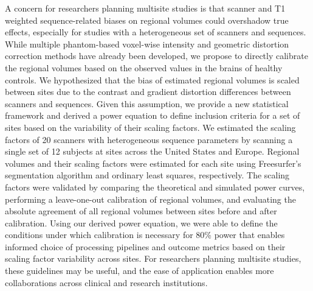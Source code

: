 
A concern for researchers planning multisite studies is that scanner and T1 weighted sequence-related biases on regional volumes could overshadow true effects, especially for studies with a heterogeneous set of scanners and sequences. While multiple phantom-based voxel-wise intensity and geometric distortion correction methods have already been developed, we propose to directly calibrate the regional volumes based on the observed values in the brains of healthy controls. We hypothesized that the bias of estimated regional volumes is scaled between sites due to the contrast and gradient distortion differences between scanners and sequences. Given this assumption, we provide a new statistical framework and derived a power equation to define inclusion criteria for a set of sites based on the variability of their scaling factors. We estimated the scaling factors of 20 scanners with heterogeneous sequence parameters by scanning a single set of 12 subjects at sites across the United States and Europe. Regional volumes and their scaling factors were estimated for each site using Freesurfer's segmentation algorithm and ordinary least squares, respectively. The scaling factors were validated by comparing the theoretical and simulated power curves, performing a leave-one-out calibration of regional volumes, and evaluating the absolute agreement of all regional volumes between sites before and after calibration. Using our derived power equation, we were able to define the conditions under which calibration is necessary for 80\% power that enables informed choice of processing pipelines and outcome metrics based on their scaling factor variability across sites. For researchers planning multisite studies, these guidelines may be useful, and the ease of application enables more collaborations across clinical and research institutions.